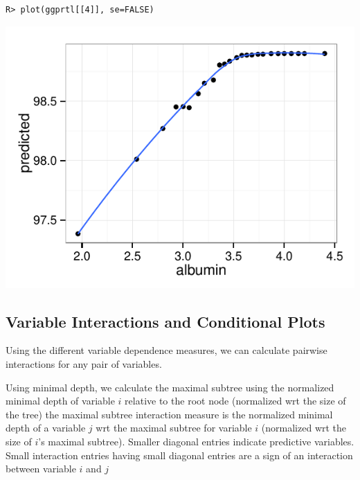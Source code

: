 \documentclass[nojss]{jss}\usepackage[]{graphicx}\usepackage[]{color}
\makeatletter
\def\maxwidth{ %
  \ifdim\Gin@nat@width>\linewidth
    \linewidth
  \else
    \Gin@nat@width
  \fi
}
\newenvironment{kframe}{%
 \def\at@end@of@kframe{}%
 \ifinner\ifhmode%
  \def\at@end@of@kframe{\end{minipage}}%
  \begin{minipage}{\columnwidth}%
 \fi\fi%
 \def\FrameCommand##1{\hskip\@totalleftmargin \hskip-\fboxsep
 \colorbox{shadecolor}{##1}\hskip-\fboxsep
     \hskip-\linewidth \hskip-\@totalleftmargin \hskip\columnwidth}%
 \MakeFramed {\advance\hsize-\width
   \@totalleftmargin\z@ \linewidth\hsize
   \@setminipage}}%
 {\par\unskip\endMakeFramed%
 \at@end@of@kframe}
\newenvironment{knitrout}{}{} %
\makeatother
\begin{document}
\begin{knitrout}\footnotesize
{}\color{fgcolor}\begin{kframe}
\begin{verbatim}
R> plot(ggprtl[[4]], se=FALSE)
\end{verbatim}
\end{kframe}

{\centering \includegraphics[width=\maxwidth]{figure/vig-pbc-partial-albumin-1} 

}



\end{knitrout}



\subsection{Variable Interactions and Conditional Plots}
Using the different variable dependence measures, we can calculate pairwise interactions for any pair of variables. 

Using minimal depth, we calculate the maximal subtree using the normalized minimal depth of variable $i$ relative to the root node (normalized wrt the size of the tree) the maximal subtree interaction measure  is the normalized minimal depth of a variable $j$ wrt the maximal subtree for variable $i$ (normalized wrt the size of $i$'s maximal subtree). Smaller diagonal entries indicate predictive variables. Small interaction entries having small diagonal entries are a sign of an interaction between variable $i$ and $j$~\citep{Ishwaran_HighDimension:2010,Ishwaran_HighDimension:2011} 
\end{document}
